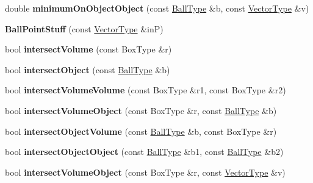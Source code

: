 \begin{DoxyCompactItemize}
double {\bfseries minimum\+On\+Object\+Object} (const \hyperlink{struct_ball}{Ball\+Type} \&b, const \hyperlink{struct_vector_type}{Vector\+Type} \&v)
\item 
\mbox{\label{struct_ball_point_stuff_a99062d9afc6afe1f8a7c8853cd723176}} 
{\bfseries Ball\+Point\+Stuff} (const \hyperlink{struct_vector_type}{Vector\+Type} \&inP)
\item 
\mbox{\label{struct_ball_point_stuff_a76bc551923878fb4d404b21c2c0500da}} 
bool {\bfseries intersect\+Volume} (const Box\+Type \&r)
\item 
\mbox{\label{struct_ball_point_stuff_ac9ee65aeabd3c24f7b6577b7dd17a8e8}} 
bool {\bfseries intersect\+Object} (const \hyperlink{struct_ball}{Ball\+Type} \&b)
\item 
\mbox{\label{struct_ball_point_stuff_a272cdbc5fd934c41f1a346d4c91d531a}} 
bool {\bfseries intersect\+Volume\+Volume} (const Box\+Type \&r1, const Box\+Type \&r2)
\item 
\mbox{\label{struct_ball_point_stuff_ae4baa20e64034648bffabcee2f649281}} 
bool {\bfseries intersect\+Volume\+Object} (const Box\+Type \&r, const \hyperlink{struct_ball}{Ball\+Type} \&b)
\item 
\mbox{\label{struct_ball_point_stuff_a80c45be6a67043c8384a0f8c0efa9869}} 
bool {\bfseries intersect\+Object\+Volume} (const \hyperlink{struct_ball}{Ball\+Type} \&b, const Box\+Type \&r)
\item 
\mbox{\label{struct_ball_point_stuff_af04b82e9447744045197d438f52ba517}} 
bool {\bfseries intersect\+Object\+Object} (const \hyperlink{struct_ball}{Ball\+Type} \&b1, const \hyperlink{struct_ball}{Ball\+Type} \&b2)
\item 
\mbox{\label{struct_ball_point_stuff_add0cd9514df2bc591981918cc97e5201}} 
bool {\bfseries intersect\+Volume\+Object} (const Box\+Type \&r, const \hyperlink{struct_vector_type}{Vector\+Type} \&v)
\item 
\mbox{\label{struct_ball_point_stuff_ab88745ed3b3b54f82c410d91675f3be9}} 

\end{DoxyCompactItemize}
